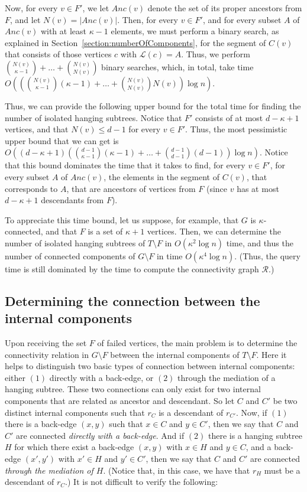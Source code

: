 \documentclass[11pt,a4paper]{article}
\begin{document}
Now, for every $v\in F'$, we let $\mathit{Anc}(v)$ denote the set of its proper ancestors from $F$, and let $N(v)=|\mathit{Anc}(v)|$. Then, for every $v\in F'$, and for every subset $A$ of $\mathit{Anc}(v)$ with at least $\kappa-1$ elements, we must perform a binary search, as explained in Section~\ref{section:numberOfComponents}, for the segment of $C(v)$ that consists of those vertices $c$ with $\mathcal{L}(c)=A$. Thus, we perform ${N(v)\choose \kappa-1}+\dots+{N(v)\choose N(v)}$ binary searches, which, in total, take time $O(({N(v)\choose \kappa-1}(\kappa-1)+\dots+{N(v)\choose N(v)}N(v))\log{n})$.

Thus, we can provide the following upper bound for the total time for finding the number of isolated hanging subtrees. Notice that $F'$ consists of at most $d-\kappa+1$ vertices, and that $N(v)\leq d-1$ for every $v\in F'$. Thus, the most pessimistic upper bound that we can get is $O((d-\kappa+1)({d-1\choose\kappa-1}(\kappa-1)+\dots+{d-1\choose d-1}(d-1))\log{n})$. Notice that this bound dominates the time that it takes to find, for every $v\in F'$, for every subset $A$ of $\mathit{Anc}(v)$, the elements in the segment of $C(v)$, that corresponds to $A$, that are ancestors of vertices from $F$ (since $v$ has at most $d-\kappa+1$ descendants from $F$).

To appreciate this time bound, let us suppose, for example, that $G$ is $\kappa$-connected, and that $F$ is a set of $\kappa+1$ vertices. Then, we can determine the number of isolated hanging subtrees of $T\setminus F$ in $O(\kappa^2\log n)$ time, and thus the number of connected components of $G\setminus F$ in time $O(\kappa^4\log{n})$. (Thus, the query time is still dominated by the time to compute the connectivity graph $\mathcal{R}$.)




\subsection{Determining the connection between the internal components}
\label{section:internal}
Upon receiving the set $F$ of failed vertices, the main problem is to determine the connectivity relation in $G\setminus F$ between the internal components of $T\setminus F$. Here it helps to distinguish two basic types of connection between internal components: either $(1)$ directly with a back-edge, or $(2)$ through the mediation of a hanging subtree. These two connections can only exist for two internal components that are related as ancestor and descendant. So let $C$ and $C'$ be two distinct internal components such that $r_C$ is a descendant of $r_{C'}$. Now, if $(1)$ there is a back-edge $(x,y)$ such that $x\in C$ and $y\in C'$, then we say that $C$ and $C'$ are connected \emph{directly with a back-edge}. And if $(2)$ there is a hanging subtree $H$ for which there exist a back-edge $(x,y)$ with $x\in H$ and $y\in C$, and a back-edge $(x',y')$ with $x'\in H$ and $y'\in C'$, then we say that $C$ and $C'$ are connected \emph{through the mediation of $H$}. (Notice that, in this case, we have that $r_H$ must be a descendant of $r_C$.) It is not difficult to verify the following:
\end{document}
